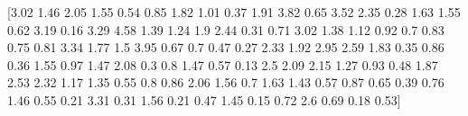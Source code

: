 \documentclass[preview]{standalone}
\begin{document}
\begin{center}
[3.02 1.46 2.05 1.55 0.54 0.85 1.82 1.01 0.37 1.91 3.82 0.65 3.52 2.35
 0.28 1.63 1.55 0.62 3.19 0.16 3.29 4.58 1.39 1.24 1.9  2.44 0.31 0.71
 3.02 1.38 1.12 0.92 0.7  0.83 0.75 0.81 3.34 1.77 1.5  3.95 0.67 0.7
 0.47 0.27 2.33 1.92 2.95 2.59 1.83 0.35 0.86 0.36 1.55 0.97 1.47 2.08
 0.3  0.8  1.47 0.57 0.13 2.5  2.09 2.15 1.27 0.93 0.48 1.87 2.53 2.32
 1.17 1.35 0.55 0.8  0.86 2.06 1.56 0.7  1.63 1.43 0.57 0.87 0.65 0.39
 0.76 1.46 0.55 0.21 3.31 0.31 1.56 0.21 0.47 1.45 0.15 0.72 2.6  0.69
 0.18 0.53]
\end{center}
\end{document}
